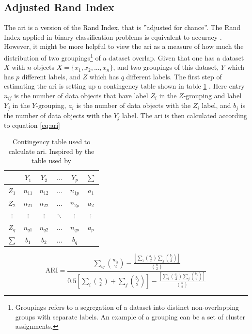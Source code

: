 \subsection{Adjusted Rand Index}
The \acrfull{ari} is a version of the Rand Index, that is ''adjusted for chance''. The Rand Index applied in binary classification problems is equivalent to accuracy \cite{ari_wikipedia}. However, it might be more helpful to view the \acrshort{ari} as a measure of how much the distribution of two groupings\footnote{Groupings refers to a segregation of a dataset into distinct non-overlapping groups with separate labels. An example of a grouping can be a set of cluster assignments.} of a dataset overlap. Given that one has a dataset $X$ with $n$ objects $X = \{x_1, x_2, ..., x_n\}$, and two groupings of this dataset, $Y$ which has $p$ different labels, and $Z$ which has $q$ different labels. The first step of estimating the \acrshort{ari} is setting up a contingency table shown in table \ref{tab:cont} \cite{ari_wikipedia}. Here entry $n_{ij}$ is the number of data objects that have label $Z_i$ in the $Z$-grouping and label $Y_j$ in the $Y$-grouping, $a_i$ is the number of data objects with the $Z_i$ label, and $b_j$ is the number of data objects with the $Y_j$ label. The \acrshort{ari} is then calculated according to equation \eqref{eq:ari}

\begin{table}
    \centering
    \begin{tabular}{c|cccc|c}
        \toprule
                 &  $Y_1$   &  $Y_2$   & $\hdots$ & $Y_p$    & $\sum$ \\
        \midrule
        $Z_1$    & $n_{11}$ & $n_{12}$ & $\hdots$ & $n_{1p}$ & $a_1$ \\
        \midrule
        $Z_2$    & $n_{21}$ & $n_{22}$ & $\hdots$ & $n_{2p}$ & $a_2$ \\
        \midrule
        $\vdots$ & $\vdots$ & $\vdots$ & $\ddots$ & $\vdots$ & $\vdots$ \\
        \midrule
        $Z_q$    & $n_{q1}$ & $n_{q2}$ & $\hdots$ & $n_{qp}$ & $a_p$ \\
        \midrule
        $\sum$   &  $b_1$   &  $b_2$   & $\hdots$ &  $b_q$   &
    \end{tabular}
    \caption{Contingency table used to calculate \acrshort{ari}. Inspired by the table used by \cite{ari_wikipedia}}
    \label{tab:cont}
\end{table}

\begin{equation}
    \mathrm{ARI} = \frac{\sum_{ij} \binom{n_{ij}}{2} - \frac{\left [ \sum_i \binom{a_i}{2} \sum_j \binom{b_j}{2} \right ]}{\binom{n}{2}} }{0.5\left [ \sum_i \binom{a_i}{2} + \sum_j \binom{b_j}{2} \right ] - \frac{\left [ \sum_i \binom{a_i}{2} \sum_j \binom{b_j}{2} \right ]}{\binom{n}{2}}}
    \label{eq:ari}
\end{equation}

